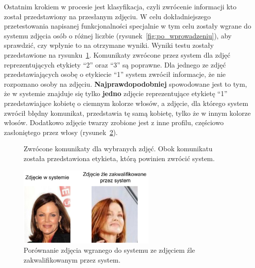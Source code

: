 Ostatnim krokiem w procesie jest klasyfikacja,
czyli zwrócenie informacji kto został przedstawiony na przesłanym zdjęciu.
W celu dokładniejszego przetestowania napisanej funkcjonalności specjalnie
w tym celu zostały wgrane do systemu zdjęcia osób
o różnej liczbie (rysunek~\ref{fig:po_wprowadzeniu}),
aby sprawdzić, czy wpłynie to na otrzymane wyniki.
Wyniki testu zostały przedstawione na rysunku~\ref{fig:rezultat_znane}.
Komunikaty zwrócone przez system dla zdjęć reprezentujących etykiety ``2'' oraz ``3'' są poprawne.
Dla jednego ze zdjęć przedstawiających osobę o etykiecie ``1'' system zwrócił informacje,
że nie rozpoznano osoby na zdjęciu.
\textbf{Najprawdopodobniej} spowodowane jest to tym, że w systemie znajduje się
tylko \textbf{jedno} zdjęcie reprezentujące etykietę ``1'' przedstawiające kobietę o ciemnym kolorze włosów,
a zdjęcie, dla którego system zwrócił błędny komunikat, przedstawia tę samą kobietę, tylko że w innym kolorze włosów.
Dodatkowo zdjęcie twarzy zrobione jest z inne profilu,
częściowo zasłoniętego przez włosy (rysunek~\ref{fig:porownanie_etykiety_1}).

\pagebreak

\begin{figure}[H]
    \centering
    \caption{
        Zwrócone komunikaty dla wybranych zdjęć.
        Obok komunikatu została przedstawiona etykieta, którą powinien zwrócić system.
    }
    \customsource
    \label{fig:rezultat_znane}
\end{figure}


\begin{figure}[H]
    \centering
    \includegraphics[width=0.6\textwidth]{images/porownanie_etykiety_1}
    \caption{ Porównanie zdjęcia wgranego do systemu ze zdjęciem źle zakwalifikowanym przez system. }
    \customsource
    \label{fig:porownanie_etykiety_1}
\end{figure}


